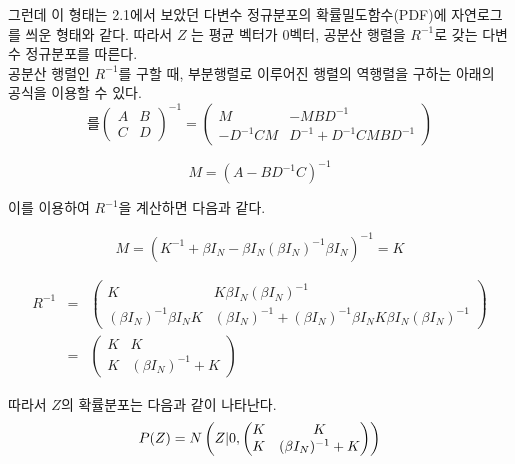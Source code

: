\documentclass[a4paper]{oblivoir}
\begin{document}
그런데 이 형태는 2.1에서 보았던 다변수 정규분포의 확률밀도함수(PDF)에 자연로그를 씌운 형태와 같다. 따라서 $Z$ 는 평균 벡터가 0벡터, 공분산 행렬을 $R^{-1}$로 갖는 다변수 정규분포를 따른다.\\
공분산 행렬인 $R^{-1}$를 구할 때, 부분행렬로 이루어진 행렬의 역행렬을 구하는 아래의 공식을 이용할 수 있다.\\

\begin{equation}를
\begin{pmatrix} A & B \\ C & D \end{pmatrix}^{-1} = \begin{pmatrix} M & -MBD^{-1} \\ -D^{-1}CM & D^{-1} +D^{-1}CMBD^{-1} \end{pmatrix}
\label{eq:12-27}
\end{equation}

\begin{equation}
M =(A -BD^{-1}C)^{-1}
\label{eq:12-28}
\end{equation} 

이를 이용하여 $R^{-1}$을 계산하면 다음과 같다.

\begin{equation}
M =(K ^{-1} +\beta I_{N} - \beta I_{N}(\beta I_{N})^{-1}\beta I_{N})^{-1} = K
\label{eq:12-29}
\end{equation} 

\begin{eqnarray}
R^{-1} & = & \begin{pmatrix} K & K \beta I_{N}(\beta I_{N})^{-1} \\ (\beta I_{N})^{-1}\beta I_{N}K & (\beta I_{N})^{-1} +(\beta I_{N})^{-1} \beta I_{N} K \beta I_{N}(\beta I_{N})^{-1} \end{pmatrix} \nonumber\\
& = & \begin{pmatrix} K & K \\ K & (\beta I_{N})^{-1}+K \end{pmatrix}
\label{eq:12-30}
\end{eqnarray} 

따라서 $Z$의 확률분포는 다음과 같이 나타난다.\\

\begin{equation}
P(Z) = N\left(Z | \space 0, \begin{pmatrix} K & K \\ K & (\beta I_{N})^{-1}+K \end{pmatrix} \right)
\label{eq:12-31}
\end{equation} 
\end{document}
